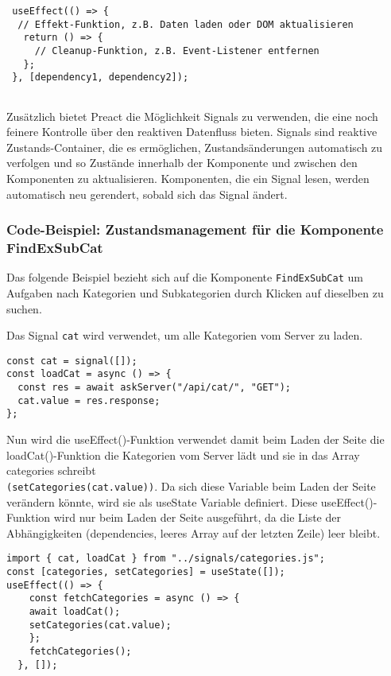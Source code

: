  \begin{lstlisting}
 useEffect(() => {
  // Effekt-Funktion, z.B. Daten laden oder DOM aktualisieren
   return () => {
     // Cleanup-Funktion, z.B. Event-Listener entfernen
   };
 }, [dependency1, dependency2]);
 
 \end{lstlisting}
   
 
 
Zusätzlich bietet Preact die Möglichkeit Signals zu verwenden, die eine noch feinere Kontrolle über den reaktiven Datenfluss bieten.
Signals sind reaktive Zustands-Container, die es ermöglichen, Zustandsänderungen automatisch zu verfolgen und so Zustände innerhalb der Komponente und zwischen den Komponenten zu aktualisieren. Komponenten, die ein Signal lesen, werden automatisch neu gerendert, sobald sich das Signal ändert.
 

\subsubsection{Code-Beispiel: Zustandsmanagement für die Komponente FindExSubCat } 
Das folgende Beispiel bezieht sich auf die Komponente \texttt{FindExSubCat} um Aufgaben nach Kategorien und Subkategorien durch Klicken auf dieselben zu suchen.

Das Signal \texttt{cat} wird verwendet, um alle Kategorien vom Server zu laden.

\begin{lstlisting}
const cat = signal([]);
const loadCat = async () => {
  const res = await askServer("/api/cat/", "GET");
  cat.value = res.response;
};

\end{lstlisting}

Nun wird die useEffect()-Funktion verwendet damit beim Laden der Seite die loadCat()-Funktion die Kategorien vom Server lädt und sie in das Array categories schreibt \\\texttt{(setCategories(cat.value))}. Da sich diese Variable beim Laden der Seite verändern könnte, wird sie als useState Variable definiert. 
Diese useEffect()-Funktion wird nur beim Laden der Seite ausgeführt, da die Liste der Abhängigkeiten (dependencies, leeres Array auf der letzten Zeile) leer bleibt. 
\newpage
\begin{lstlisting}
import { cat, loadCat } from "../signals/categories.js";
const [categories, setCategories] = useState([]);
useEffect(() => {
    const fetchCategories = async () => {
    await loadCat();
    setCategories(cat.value);
    };
    fetchCategories();
  }, []);

\end{lstlisting}


